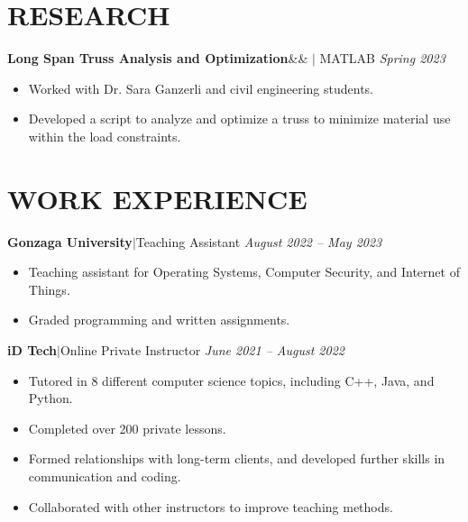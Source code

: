 \documentclass[11pt, a4paper, roman]{moderncv}
\newcommand{\project}[5]{
	\textbf{#1}\ifx&#2&{}
	\else
    		\href{#2}{\:\small\faGithub\:}\fi$|$ #3
	\hfill\textit{#4}
	#5
	\vspace{2mm}
}
\newcommand{\entry}[4]{
	\textbf{#1}\:$|$\:#2 
	\hfill\textit{#3}
	#4
	\vspace{2mm}
}
\begin{document}
\vspace*{-2mm}
\section{RESEARCH}
{\project{Long Span Truss Analysis and Optimization}{}{MATLAB}{Spring 2023}
	{\begin{itemize}
		\item Worked with Dr. Sara Ganzerli and civil engineering students.
		\item Developed a script to analyze and optimize a truss to minimize material use within the load constraints.
	\end{itemize}}
}

\vspace*{-2mm}
\section{WORK EXPERIENCE}

\entry{Gonzaga University}{Teaching Assistant}{August 2022 -- May 2023}
{\begin{itemize}
	\item Teaching assistant for Operating Systems, Computer Security, and Internet of Things.
	\item Graded programming and written assignments.
\end{itemize}
}

\entry{iD Tech}{Online Private Instructor}{June 2021 -- August 2022}
{\begin{itemize}
    \item Tutored in 8 different computer science topics, including C++, Java, and Python.
    \item Completed over 200 private lessons.
    \item Formed relationships with long-term clients, and developed further skills in communication and coding.
    \item Collaborated with other instructors to improve teaching methods.
  \end{itemize}
}

\end{document}
